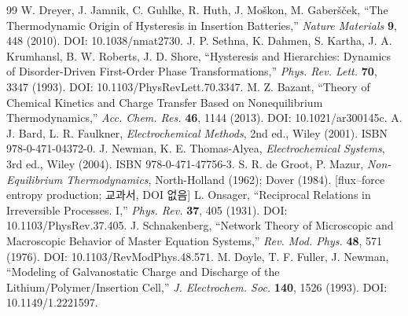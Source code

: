 \documentclass[11pt,a4paper]{article}
\newcommand{\brk}{\discretionary{}{}{}}%
\begin{document}
\begin{thebibliography}{99}
 W. Dreyer, J. Jamnik, C. Guhlke, R. Huth, J. Mo\v{s}kon, M. Gaber\v{s}\v{c}ek,
  ``The Thermodynamic Origin of Hysteresis in Insertion Batteries,'' \emph{Nature Materials} \textbf{9},
  448 (2010). DOI: 10.1038/\brk nmat2730.
 J. P. Sethna, K. Dahmen, S. Kartha, J. A. Krumhansl, B. W. Roberts, J. D. Shore,
  ``Hysteresis and Hierarchies: Dynamics of Disorder-Driven First-Order Phase Transformations,''
  \emph{Phys. Rev. Lett.} \textbf{70}, 3347 (1993). DOI: 10.1103/\brk PhysRevLett.70.3347.
 M. Z. Bazant, ``Theory of Chemical Kinetics and Charge Transfer Based on
  Nonequilibrium Thermodynamics,'' \emph{Acc. Chem. Res.} \textbf{46}, 1144 (2013). DOI: 10.1021/\brk ar300145c.
 A. J. Bard, L. R. Faulkner, \emph{Electrochemical Methods}, 2nd ed., Wiley (2001).
  ISBN 978-0-\brk 471-04372-0.
 J. Newman, K. E. Thomas-Alyea, \emph{Electrochemical Systems}, 3rd ed., Wiley (2004).
  ISBN 978-0-\brk 471-47756-3.
 S. R. de Groot, P. Mazur, \emph{Non-Equilibrium Thermodynamics},
  North-Holland (1962); Dover (1984). [flux--force entropy production; 교과서, DOI 없음]
 L. Onsager, ``Reciprocal Relations in Irreversible Processes. I,'' \emph{Phys. Rev.}
  \textbf{37}, 405 (1931). DOI: 10.1103/\brk PhysRev.37.405.
 J. Schnakenberg, ``Network Theory of Microscopic and Macroscopic Behavior of
  Master Equation Systems,'' \emph{Rev. Mod. Phys.} \textbf{48}, 571 (1976). DOI: 10.1103/\brk RevModPhys.48.571.
 M. Doyle, T. F. Fuller, J. Newman, ``Modeling of Galvanostatic Charge and Discharge
  of the Lithium/Polymer/Insertion Cell,'' \emph{J. Electrochem. Soc.} \textbf{140}, 1526 (1993).
  DOI: 10.1149/\brk 1.2221597.
\end{thebibliography}
\end{document}
